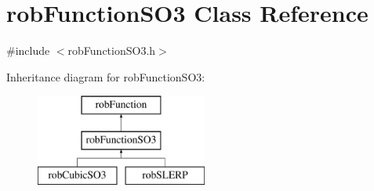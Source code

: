 \hypertarget{classrob_function_s_o3}{}\section{rob\+Function\+S\+O3 Class Reference}
\label{classrob_function_s_o3}


{\ttfamily \#include $<$rob\+Function\+S\+O3.\+h$>$}

Inheritance diagram for rob\+Function\+S\+O3\+:\begin{figure}[H]
\begin{center}
\leavevmode
\includegraphics[height=3.000000cm]{d8/d7c/classrob_function_s_o3}
\end{center}
\end{figure}
